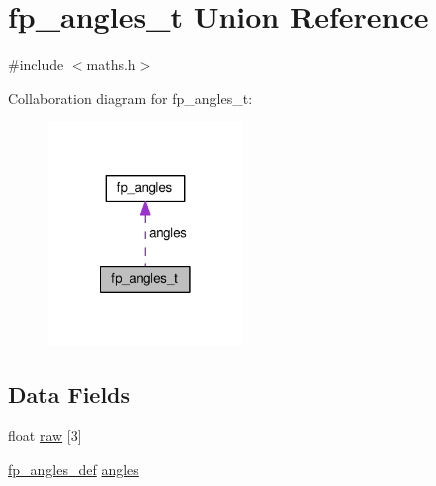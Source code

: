 \hypertarget{unionfp__angles__t}{\section{fp\+\_\+angles\+\_\+t Union Reference}
\label{unionfp__angles__t}
}


{\ttfamily \#include $<$maths.\+h$>$}



Collaboration diagram for fp\+\_\+angles\+\_\+t\+:\nopagebreak
\begin{figure}[H]
\begin{center}
\leavevmode
\includegraphics[width=146pt]{unionfp__angles__t__coll__graph}
\end{center}
\end{figure}
\subsection*{Data Fields}
\begin{DoxyCompactItemize}
\item 
float \hyperlink{unionfp__angles__t_a32ef06c827de340b48a6446899283295}{raw} \mbox{[}3\mbox{]}
\item 
\hyperlink{maths_8h_ae8dce9df3c21175ef9fdfc8b5882f8a3}{fp\+\_\+angles\+\_\+def} \hyperlink{unionfp__angles__t_a4207a1efb367370e211ae35bc5a40d27}{angles}
\end{DoxyCompactItemize}


